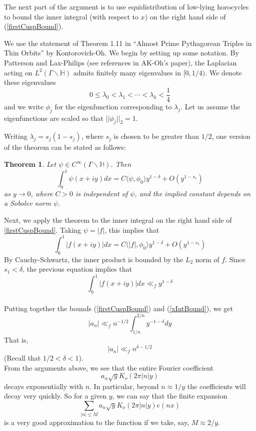 \documentclass[]{article}
\newtheorem*{theorem}{Theorem}
\begin{document}
The next part of the argument is to use equidistribution of low-lying horocycles to bound the inner integral (with respect to $x$) on the right hand side of (\ref{firstCuspBound}).

We use the statement of Theorem 1.11 in ``Almost Prime Pythagorean Triples in Thin Orbits'' by Kontorovich-Oh.
We begin by setting up some notation.
By Patterson and Lax-Philips (see references in AK-Oh's paper), the Laplacian acting on $L^2(\Gamma\backslash\mathbb{H})$ admits finitely many eigenvalues in $[0, 1/4)$.
We denote these eigenvalues
$$
0 \leq \lambda_0 < \lambda_1 < \cdots < \lambda_k < \frac{1}{4}
$$
and we write $\phi_j$ for the eigenfunction corresponding to $\lambda_j$.
Let us assume the eigenfunctions are scaled so that $||\phi_j||_2 = 1$.

Writing $\lambda_j = s_j(1 - s_j)$, where $s_j$ is chosen to be greater than $1/2$, one version of the theorem can be stated as follows:
\begin{theorem}
	Let $\psi \in C^\infty(\Gamma\backslash\mathbb{H})$. Then
	$$
	\int_{0}^{1}\psi(x + iy)dx =
	C\langle \psi, \phi_0 \rangle y^{1-\delta} + O\left( y^{1 - s_1} \right)
	$$
	as $y \rightarrow 0$, where $C > 0$ is independent of $\psi$, and the implied constant depends on a Sobolev norm $\psi$.
\end{theorem}

Next, we apply the theorem to the inner integral on the right hand side of \ref{firstCuspBound}.
Taking $\psi = |f|$, this implies that
$$
\int_{0}^{1}|f(x + iy)|dx =
C\langle |f|, \phi_0 \rangle y^{1-\delta} + O\left( y^{1 - s_1} \right)
$$
By Cauchy-Schwartz, the inner product is bounded by the $L_2$ norm of $f$.
Since $s_1 < \delta$, the previous equation implies that
\begin{equation}\label{xIntBound}
	\int_{0}^{1}|f(x + iy)|dx \ll_f y^{1 - \delta}
\end{equation}
\\

Putting together the bounds (\ref{firstCuspBound}) and (\ref{xIntBound}), we get
$$
|a_n| \ll_f n^{-1/2}\int_{1/n}^{2/n}y^{-1-\delta}dy
$$
That is,
\begin{equation}\label{cuspBound}
	|a_n| \ll_f n^{\delta-1/2}
\end{equation}
(Recall that $1/2 < \delta < 1$).
\\

From the arguments above, we see that the entire Fourier coefficient
$$
a_n\sqrt{y}K_\nu(2\pi|n|y)
$$
decays exponentially with $n$.
In particular, beyond $n \approx 1/y$ the coefficients will decay very quickly.
So for a given $y$, we can say that the finite expansion
$$
\sum_{|n| \leq M}a_n\sqrt{y}K_\nu(2\pi|n|y)e(nx)
$$
is a very good approximation to the function if we take, say, $M \approx 2/y$.
\end{document}
